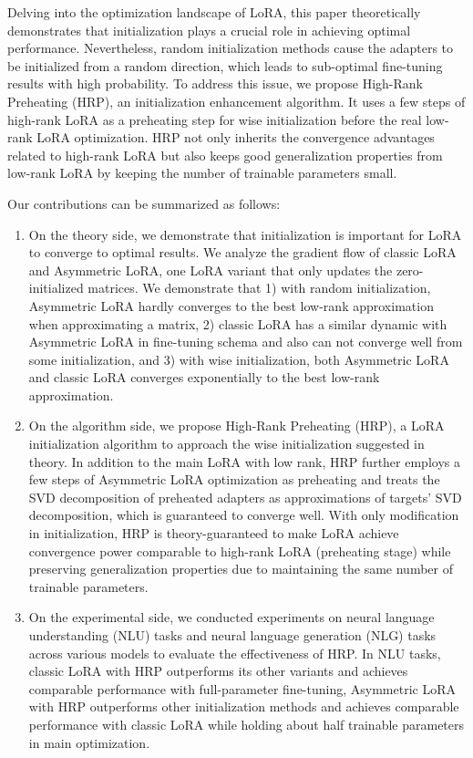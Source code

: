 Delving into the optimization landscape of LoRA, this paper theoretically demonstrates that initialization plays a crucial role in achieving optimal performance. Nevertheless, random initialization methods cause the adapters to be initialized from a random direction, which leads to sub-optimal fine-tuning results with high probability. 
To address this issue, we propose High-Rank Preheating (HRP), an initialization enhancement algorithm. It uses a few steps of high-rank LoRA as a preheating step for wise initialization before the real low-rank LoRA optimization. HRP not only inherits the convergence advantages related to high-rank LoRA but also keeps good generalization properties from low-rank LoRA by keeping the number of trainable parameters small.

Our contributions can be summarized as follows:

\begin{enumerate}
    \item On the theory side, we demonstrate that initialization is important for LoRA to converge to optimal results. We analyze the gradient flow of classic LoRA and Asymmetric LoRA, one LoRA variant that only updates the zero-initialized matrices. We demonstrate that 1) with random initialization, Asymmetric LoRA hardly converges to the best low-rank approximation when approximating a matrix, 2) classic LoRA has a similar dynamic with Asymmetric LoRA in fine-tuning schema and also can not converge well from some initialization, and 3) with wise initialization, both Asymmetric LoRA and classic LoRA converges exponentially to the best low-rank approximation. 
    \item On the algorithm side, we propose High-Rank Preheating (HRP), a LoRA initialization algorithm to approach the wise initialization suggested in theory. In addition to the main LoRA with low rank, HRP further employs a few steps of Asymmetric LoRA optimization as preheating and treats the SVD decomposition of preheated adapters as approximations of targets' SVD decomposition, which is guaranteed to converge well. With only modification in initialization, HRP is theory-guaranteed to make LoRA achieve convergence power comparable to high-rank LoRA (preheating stage) while preserving generalization properties due to maintaining the same number of trainable parameters. 
    \item On the experimental side, we conducted experiments on neural language understanding (NLU) tasks and neural language generation (NLG) tasks across various models to evaluate the effectiveness of HRP. In NLU tasks, classic LoRA with HRP outperforms its other variants and achieves comparable performance with full-parameter fine-tuning, Asymmetric LoRA with HRP outperforms other initialization methods and achieves comparable performance with classic LoRA while holding about half trainable parameters in main optimization. 
\end{enumerate}









